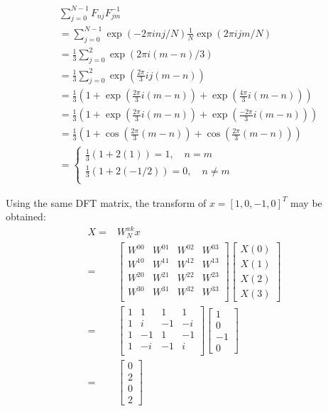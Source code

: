 \documentclass[twocolumn]{article}
\begin{document}
\begin{equation}
\begin{split}
&\sum_{j=0}^{N-1} F_{nj} F_{jm}^{-1} \\ &= \sum_{j=0}^{N-1} \exp(-2\pi i nj/N) \frac{1}{N} \exp(2\pi ijm/N) \\
&= \frac{1}{3} \sum_{j=0}^{2} \exp(2\pi i(m-n)/3)  \\
&= \frac{1}{3} \sum_{j=0}^{2} \exp(\frac{2\pi}{3} ij(m-n))  \\
&= \frac{1}{3} (1 + \exp(\frac{2\pi}{3} i(m-n)) + \exp(\frac{4\pi}{3} i(m-n))  )\\
&= \frac{1}{3} (1 + \exp(\frac{2\pi}{3} i(m-n)) + \exp(\frac{-2\pi}{3} i(m-n))  )\\
&= \frac{1}{3} (1 + \cos(\frac{2\pi}{3}(m-n)) + \cos(\frac{2\pi}{3} (m-n))  )\\
&=\begin{cases}
\frac{1}{3} (1 + 2(1)) = 1, \quad n=m \\
\frac{1}{3} (1 + 2(-1/2)) =0, \quad n\neq m\\
\end{cases}
\end{split}
\end{equation}

Using the same DFT matrix, the transform of $x=[1,0,-1,0]^T$ may be obtained:
\begin{equation}
\begin{split}
X =& W^{xk}_N x \\
=&\begin{bmatrix}
W^{00} & W^{01} & W^{02} & W^{03} \\
W^{10} & W^{11} & W^{12} & W^{13} \\
W^{20} & W^{21} & W^{22} & W^{23} \\
W^{30} & W^{31} & W^{32} & W^{33} \\
\end{bmatrix} \begin{bmatrix}X(0) \\ X(1) \\ X(2) \\ X(3)\end{bmatrix} \\
=& \begin{bmatrix}
1 & 1 & 1 & 1 \\
1 & i & -1 & -i \\
1 & -1 & 1 & -1 \\
1 & -i & -1 & i \\
\end{bmatrix} \begin{bmatrix}1 \\ 0 \\ -1 \\ 0\end{bmatrix} \\
=& \begin{bmatrix}0 \\ 2 \\ 0 \\ 2\end{bmatrix} \\
\end{split}
\end{equation}
\end{document}
